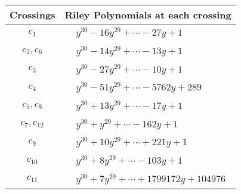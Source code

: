 \documentclass[1p]{elsarticle_modified}
\theoremstyle{definition}
\begin{document}
\begin{tabular}{m{50pt}|m{274pt}}
Crossings & \hspace{64pt}Riley Polynomials at each crossing \\
\hline $$\begin{aligned}c_{1}\end{aligned}$$&$\begin{aligned}
&y^{30}-16 y^{29}+\cdots-27 y+1
\end{aligned}$\\
\hline $$\begin{aligned}c_{2},c_{6}\end{aligned}$$&$\begin{aligned}
&y^{30}-14 y^{29}+\cdots-13 y+1
\end{aligned}$\\
\hline $$\begin{aligned}c_{3}\end{aligned}$$&$\begin{aligned}
&y^{30}-27 y^{29}+\cdots-10 y+1
\end{aligned}$\\
\hline $$\begin{aligned}c_{4}\end{aligned}$$&$\begin{aligned}
&y^{30}-51 y^{29}+\cdots-5762 y+289
\end{aligned}$\\
\hline $$\begin{aligned}c_{5},c_{8}\end{aligned}$$&$\begin{aligned}
&y^{30}+13 y^{29}+\cdots-17 y+1
\end{aligned}$\\
\hline $$\begin{aligned}c_{7},c_{12}\end{aligned}$$&$\begin{aligned}
&y^{30}+y^{29}+\cdots-162 y+1
\end{aligned}$\\
\hline $$\begin{aligned}c_{9}\end{aligned}$$&$\begin{aligned}
&y^{30}+10 y^{29}+\cdots+221 y+1
\end{aligned}$\\
\hline $$\begin{aligned}c_{10}\end{aligned}$$&$\begin{aligned}
&y^{30}+8 y^{29}+\cdots-103 y+1
\end{aligned}$\\
\hline $$\begin{aligned}c_{11}\end{aligned}$$&$\begin{aligned}
&y^{30}+7 y^{29}+\cdots+1799172 y+104976
\end{aligned}$\\
\hline
\end{tabular}\\~\\
\end{document}

